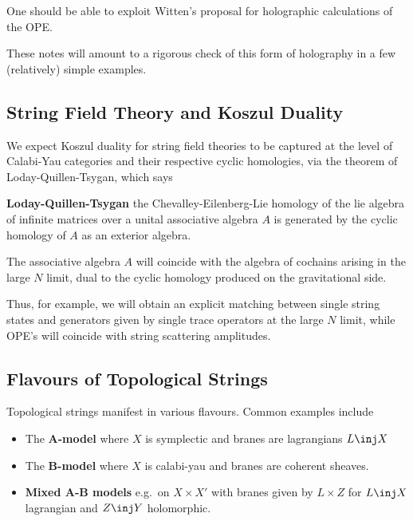 \documentclass[12pt]{amsart}
\begin{document}
  \begin{rmk}
    One should be able to exploit Witten's proposal for holographic
    calculations of the OPE.
  \end{rmk}

  These notes will amount to a rigorous check of this form of holography in a
  few (relatively) simple examples.

\subsection{String Field Theory and Koszul Duality}
  We expect Koszul duality for string field theories to be captured at the
  level of Calabi-Yau categories and their respective cyclic homologies, via
  the theorem of Loday-Quillen-Tsygan, which says
  \begin{thm}
    \textbf{Loday-Quillen-Tsygan} the Chevalley-Eilenberg-Lie homology of the
    lie algebra of infinite matrices over a unital associative algebra $A$ is
    generated by the cyclic homology of $A$ as an exterior algebra.
  \end{thm}

  The associative algebra $A$ will coincide with the algebra of cochains arising in the
  large $N$ limit, dual to the cyclic homology produced on the gravitational
  side.\par

  Thus, for example, we will obtain an explicit matching between single string states and
  generators given by single trace operators\footnotemark{} at the large $N$ limit, while OPE's will coincide with
  string scattering amplitudes.

\subsection{Flavours of Topological Strings}
Topological strings manifest in various flavours. Common examples include

\begin{itemize}
  \item The \textbf{A-model} where $X$ is symplectic and branes are
    lagrangians $L \inj X$
  \item The \textbf{B-model} where $X$ is calabi-yau and branes are coherent
    sheaves.
  \item \textbf{Mixed A-B models} e.g.\ on $X \times X'$ with branes given by
    $L\times Z$ for $L \inj X$ lagrangian and $Z \inj Y$ holomorphic.
\end{itemize}
\end{document}
